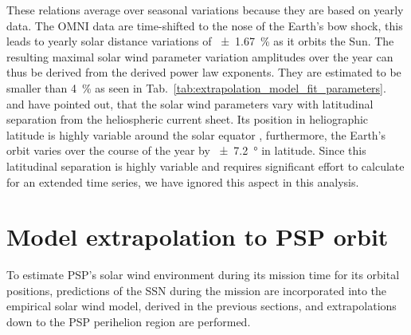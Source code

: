 \documentclass[]{aa}
\begin{document}
	These relations average over seasonal variations because they are based on yearly data. The OMNI data are time-shifted to the nose of the Earth’s bow shock, this leads to yearly solar distance variations of \SI{+-1.67}{\%} as it orbits the Sun. The resulting maximal solar wind parameter variation amplitudes over the year can thus be derived from the derived power law exponents. They are estimated to be smaller than \SI{4}{\percent} as seen in Tab.~\ref{tab:extrapolation_model_fit_parameters}. \citet{Bruno1986} and \citet{Balogh1999} have pointed out, that the solar wind parameters vary with latitudinal separation from the heliospheric current sheet. Its position in heliographic latitude is highly variable around the solar equator \citep{Schwenn1990}, furthermore, the Earth’s orbit varies over the course of the year by \SI{+-7.2}{\degree} in latitude. Since this latitudinal separation is highly variable and requires significant effort to calculate for an extended time series, we have ignored this aspect in this analysis.

	\section{Model extrapolation to PSP orbit}
	\label{sec:model_extrapolation_to_psp_orbit}
	To estimate PSP’s solar wind environment during its mission time for its orbital positions, predictions of the SSN during the mission are incorporated into the empirical solar wind model, derived in the previous sections, and extrapolations down to the PSP perihelion region are performed.
\end{document}
